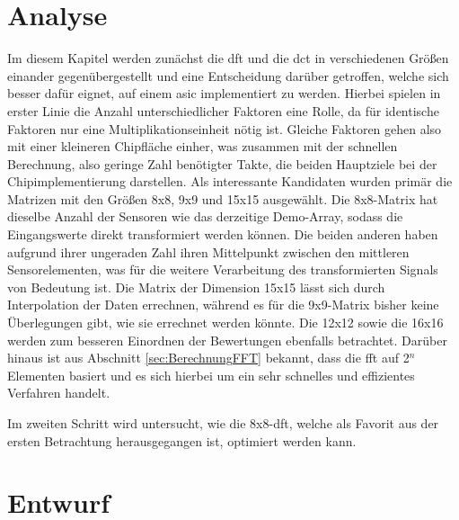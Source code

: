  
 
 
 
 
\chapter{Analyse}
Im diesem Kapitel werden zunächst die \gls{dft} und die \gls{dct} in verschiedenen Größen einander gegenübergestellt und eine Entscheidung darüber getroffen, welche
sich besser dafür eignet, auf einem \gls{asic} implementiert zu werden. Hierbei spielen in erster Linie die Anzahl unterschiedlicher Faktoren eine Rolle, 
da für identische Faktoren nur eine Multiplikationseinheit nötig ist. Gleiche Faktoren gehen also mit einer kleineren Chipfläche einher, was zusammen mit der schnellen 
Berechnung, also geringe Zahl benötigter Takte, die beiden Hauptziele bei der Chipimplementierung darstellen.
Als interessante Kandidaten wurden primär die Matrizen mit den Größen 8x8, 9x9 und 15x15 ausgewählt. 
Die 8x8-Matrix hat dieselbe Anzahl der Sensoren wie das derzeitige Demo-Array, sodass die Eingangswerte
direkt transformiert werden können. 
Die beiden anderen haben aufgrund ihrer ungeraden Zahl ihren Mittelpunkt zwischen den mittleren Sensorelementen, was für die 
weitere Verarbeitung des transformierten Signals von Bedeutung ist. Die Matrix der Dimension 15x15 lässt sich durch Interpolation der Daten errechnen, während es für
die 9x9-Matrix bisher keine Überlegungen gibt, wie sie errechnet werden könnte.
Die 12x12 sowie die 16x16 werden zum besseren Einordnen der Bewertungen ebenfalls betrachtet.
Darüber hinaus ist aus Abschnitt \ref{sec:BerechnungFFT} bekannt, dass die \gls{fft} auf 2$^n$ Elementen basiert und es sich hierbei um ein sehr schnelles und 
effizientes Verfahren handelt. 

Im zweiten Schritt wird untersucht, wie die 8x8-\gls{dft}, welche als Favorit aus der ersten Betrachtung herausgegangen ist, optimiert werden kann.


 
 
 
 

 
 
 
\chapter{Entwurf}

 

 
 
 
 
